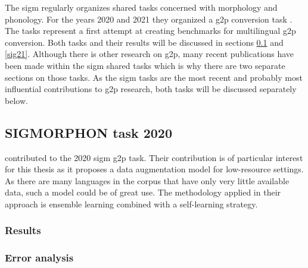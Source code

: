 The \ac{sigm} \citep{Sigmorphon.2021} regularly organizes shared tasks concerned with morphology and phonology. For the years 2020 and 2021 they organized a \ac{g2p} conversion task \citep{Ashby&Bartley.2021, gorman-etal-2020-sigmorphon}. The tasks represent a first attempt at creating benchmarks for multilingual \ac{g2p} conversion. Both tasks and their results will be discussed in sections \ref{sig20} and \ref{sig21}. Although there is other research on \ac{g2p}, many recent publications have been made within the \ac{sigm} shared tasks which is why there are two separate sections on those tasks. As the \ac{sigm} tasks are the most recent and probably most influential contributions to \ac{g2p} research, both tasks will be discussed separately below. 

\subsection{SIGMORPHON task 2020}
\label{sig20}

\citet{yu-etal-2020} contributed to the 2020 \ac{sigm} \ac{g2p} task. Their contribution is of particular interest for this thesis as it proposes a data augmentation model for low-resource settings. As there are many languages in the corpus that have only very little available data, such a model could be of great use. The methodology applied in their approach is ensemble learning combined with a self-learning strategy. 


\subsubsection*{Results}

  
\subsubsection*{Error analysis}


